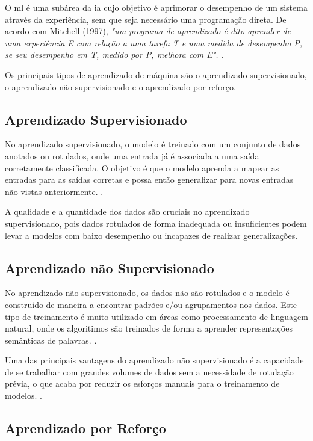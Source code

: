 O \gls{ml} é uma subárea da \gls{ia} cujo objetivo é aprimorar o desempenho de um sistema através da experiência, sem que seja necessário uma programação direta. De acordo com Mitchell (1997), \textit{"um programa de aprendizado é dito aprender de uma experiência E com relação a uma tarefa T e uma medida de desempenho P, se seu desempenho em T, medido por P, melhora com E".} \cite{Mitchell1997}. 

Os principais tipos de aprendizado de máquina são o aprendizado supervisionado, o aprendizado não supervisionado e o aprendizado por reforço. 

\subsection{Aprendizado Supervisionado}\label{subsec:ml1}

No aprendizado supervisionado, o modelo é treinado com um conjunto de dados anotados ou rotulados, onde uma entrada já é associada a uma saída corretamente classificada. O objetivo é que o modelo aprenda a mapear as entradas para as saídas corretas e possa então generalizar para novas entradas não vistas anteriormente. \cite{Goodfellow2016}.

A qualidade e a quantidade dos dados são cruciais no aprendizado supervisionado, pois dados rotulados de forma inadequada ou insuficientes podem levar a modelos com baixo desempenho ou incapazes de realizar generalizações.

\subsection{Aprendizado não Supervisionado}\label{subsec:ml2}

No aprendizado não supervisionado, os dados não são rotulados e o modelo é construído de maneira a encontrar padrões e/ou agrupamentos nos dados. Este tipo de treinamento é muito utilizado em áreas como processamento de linguagem natural, onde os algoritimos são treinados de forma a aprender representações semânticas de palavras. \cite{Goodfellow2016}.

Uma das principais vantagens do aprendizado não supervisionado é a capacidade de se trabalhar com grandes volumes de dados sem a necessidade de rotulação prévia, o que acaba por reduzir os esforços manuais para o treinamento de modelos. \cite{Murphy2012}.  

\subsection{Aprendizado por Reforço}\label{subsec:ml3}

